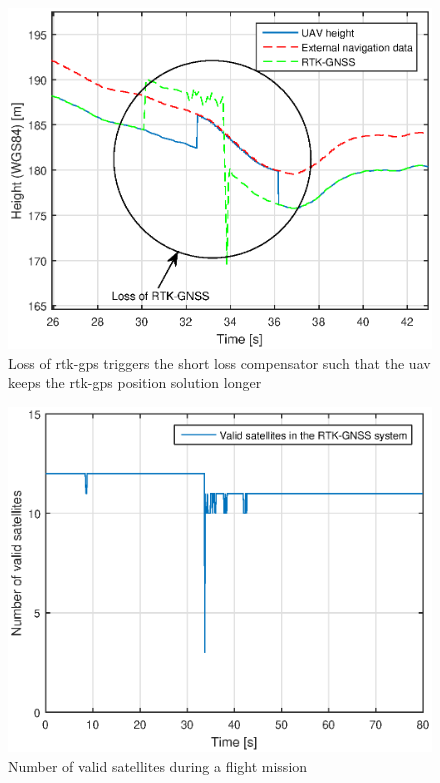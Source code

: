 \begin{figure}[H]
\centering
\includegraphics[scale=0.7]{figs/Experiment/shortrtkloss1juni114124.eps}
\caption{Loss of \gls{rtk-gps} triggers the short loss compensator such that the \gls{uav} keeps the \gls{rtk-gps} position solution longer}
\label{Fig:ShortLoss}
\end{figure}
\begin{figure}[H]
\centering
\includegraphics[scale=0.7]{figs/Experiment/ShortrtklossSatellites1juni114124.eps}
\caption{Number of valid satellites during a flight mission}
\label{Fig:SatCount1juni114124}
\end{figure}
